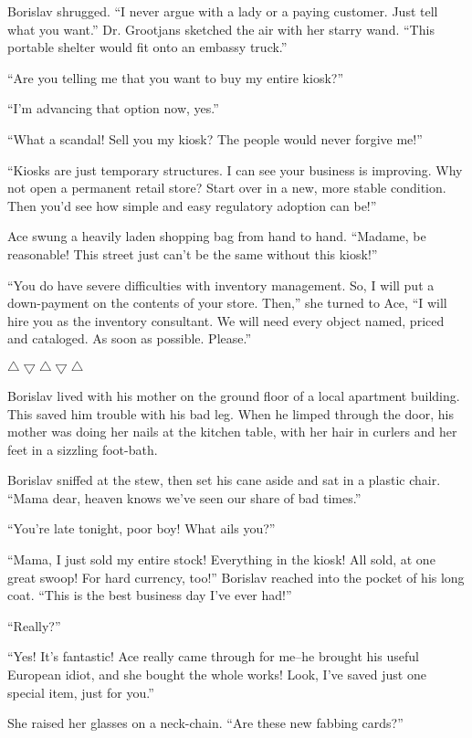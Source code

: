 \documentclass[20 pt,twoside,extrafontsizes,final]{memoir}
\begin{document}
Borislav shrugged. ``I never argue with a lady or a paying customer. Just tell what you want.''
Dr. Grootjans sketched the air with her starry wand. ``This portable shelter would fit onto an embassy truck.''

``Are you telling me that you want to buy my entire kiosk?''

``I'm advancing that option now, yes.''

``What a scandal! Sell you my kiosk? The people would never forgive me!''

``Kiosks are just temporary structures. I can see your business is improving. Why not open a permanent retail store? Start over in a new, more stable condition. Then you'd see how simple and easy regulatory adoption can be!''

Ace swung a heavily laden shopping bag from hand to hand. ``Madame, be reasonable! This street just can't be the same without this kiosk!''

``You do have severe difficulties with inventory management. So, I will put a down-payment on the contents of your store. Then,'' she turned to Ace, ``I will hire you as the inventory consultant. We will need every object named, priced and cataloged. As soon as possible. Please.''

\bigskip\centerline{{$\bigtriangleup\bigtriangledown\bigtriangleup\bigtriangledown\bigtriangleup$}}\bigskip
Borislav lived with his mother on the ground floor of a local apartment building. This saved him trouble with his bad leg. When he limped through the door, his mother was doing her nails at the kitchen table, with her hair in curlers and her feet in a sizzling foot-bath.

Borislav sniffed at the stew, then set his cane aside and sat in a plastic chair.
``Mama dear, heaven knows we've seen our share of bad times.''

``You're late tonight, poor boy! What ails you?''

``Mama, I just sold my entire stock! Everything in the kiosk! All sold, at one great swoop! For hard currency, too!'' Borislav reached into the pocket of his long coat. ``This is the best business day I've ever had!''

``Really?''

``Yes! It's fantastic! Ace really came through for me--he brought his useful European idiot, and she bought the whole works! Look, I've saved just one special item, just for you.''

She raised her glasses on a neck-chain. ``Are these new fabbing cards?''
\end{document}
